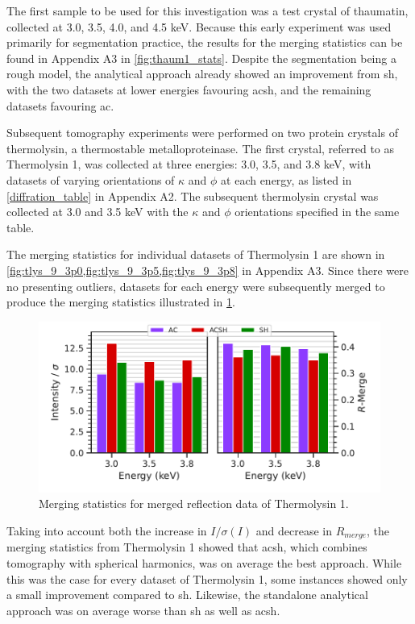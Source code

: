 The first sample to be used for this investigation was a test crystal of thaumatin, collected at 3.0, 3.5, 4.0, and 4.5 \unit{keV}. Because this early experiment was used primarily for segmentation practice, the results for the merging statistics can be found in Appendix A3 in \cref{fig:thaum1_stats}. Despite the segmentation being a rough model, the analytical approach already showed an improvement from \ac{sh}, with the two datasets at lower energies favouring \ac{acsh}, and the remaining datasets favouring \ac{ac}.

Subsequent tomography experiments were performed on two protein crystals of thermolysin, a thermostable metalloproteinase. The first crystal, referred to as Thermolysin 1, was collected at three energies: 3.0, 3.5, and 3.8 \unit{keV}, with datasets of varying orientations of $\kappa$ and $\phi$ at each energy, as listed in \cref{diffration_table} in Appendix A2. The subsequent thermolysin crystal was collected at 3.0 and 3.5 \unit{keV} with the $\kappa$ and $\phi$ orientations specified in the same table.

The merging statistics for individual datasets of Thermolysin 1 are shown in \cref{fig:tlys_9_3p0,fig:tlys_9_3p5,fig:tlys_9_3p8} in Appendix A3. Since there were no presenting outliers, datasets for each energy were subsequently merged to produce the merging statistics illustrated in \cref{fig:tlys_9_stats}.

\begin{figure}
    \centering
    \includegraphics{plots/exp1/tlys_9_P6122/merged_stats.pdf}
    \caption{Merging statistics for merged reflection data of Thermolysin 1.}
    \label{fig:tlys_9_stats}
\end{figure}


Taking into account both the increase in $I/\sigma(I)$ and decrease in $R_{merge}$, the merging statistics from Thermolysin 1 showed that \ac{acsh}, which combines tomography with spherical harmonics, was on average the best approach. While this was the case for every dataset of Thermolysin 1, some instances showed only a small improvement compared to \ac{sh}. Likewise, the standalone analytical approach was on average worse than \ac{sh} as well as \ac{acsh}.

